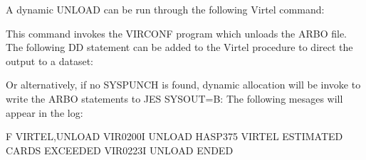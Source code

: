 \documentclass[letterpaper,10pt,english]{sphinxmanual}
\begin{document}
\ignorespaces 
\sphinxAtStartPar
A dynamic UNLOAD can be run through the following Virtel command:\sphinxhyphen{}

\begin{sphinxVerbatim}[commandchars=\\\{\}]
 
\end{sphinxVerbatim}

\sphinxAtStartPar
This command invokes the VIRCONF program which unloads the ARBO file. The following DD statement can be added to the Virtel procedure to direct the output to a dataset:

\begin{sphinxVerbatim}[commandchars=\\\{\}]
  
 
 
\end{sphinxVerbatim}

\sphinxAtStartPar
Or alternatively, if no SYSPUNCH is found, dynamic allocation will be invoke to write the ARBO statements to JES SYSOUT=B: The following mesages will appear in the log:\sphinxhyphen{}

\begin{sphinxVerbatim}[commandchars=\\\{\}]
F VIRTEL,UNLOAD
VIR0200I UNLOAD
\PYGZdl{}HASP375 VIRTEL ESTIMATED  CARDS EXCEEDED
VIR0223I UNLOAD ENDED
\end{sphinxVerbatim}

\ignorespaces 
\end{document}
